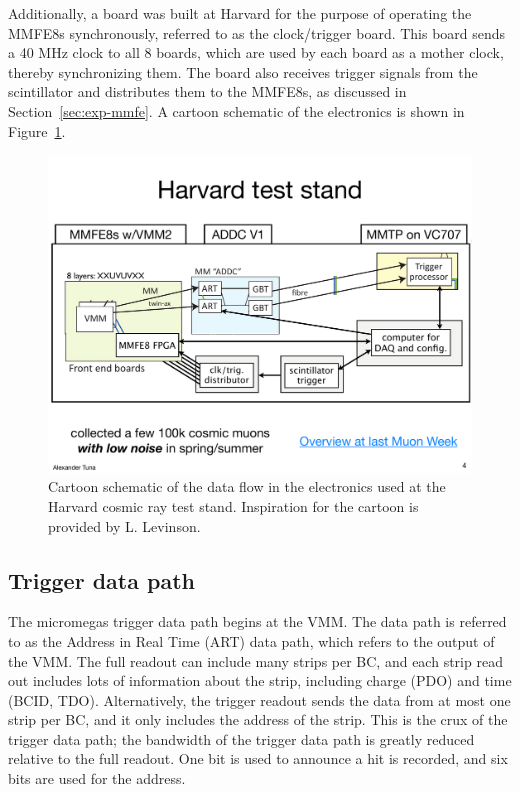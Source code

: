 Additionally, a board was built at Harvard for the purpose of operating the MMFE8s synchronously, referred to as the clock/trigger board. This board sends a 40 MHz clock to all 8 boards, which are used by each board as a mother clock, thereby synchronizing them. The board also receives trigger signals from the scintillator and distributes them to the MMFE8s, as discussed in Section~\ref{sec:exp-mmfe}. A cartoon schematic of the electronics is shown in Figure~\ref{fig:cartoon_elx}.

\begin{figure}[!htpb]
  \begin{center}
    \includegraphics[width=1.0\textwidth]{figures/cartoons/electronics_path.pdf}
  \end{center}
  \vspace{-20pt}
  \caption{Cartoon schematic of the data flow in the electronics used at the Harvard cosmic ray test stand. Inspiration for the cartoon is provided by L. Levinson.}
  \label{fig:cartoon_elx}
\end{figure}

\subsection{Trigger data path}
\label{sec:exp-art}

The micromegas trigger data path begins at the VMM. The data path is referred to as the Address in Real Time (ART) data path, which refers to the output of the VMM. The full readout can include many strips per BC, and each strip read out includes lots of information about the strip, including charge (PDO) and time (BCID, TDO). Alternatively, the trigger readout sends the data from at most one strip per BC, and it only includes the address of the strip. This is the crux of the trigger data path; the bandwidth of the trigger data path is greatly reduced relative to the full readout. One bit is used to announce a hit is recorded, and six bits are used for the address.

